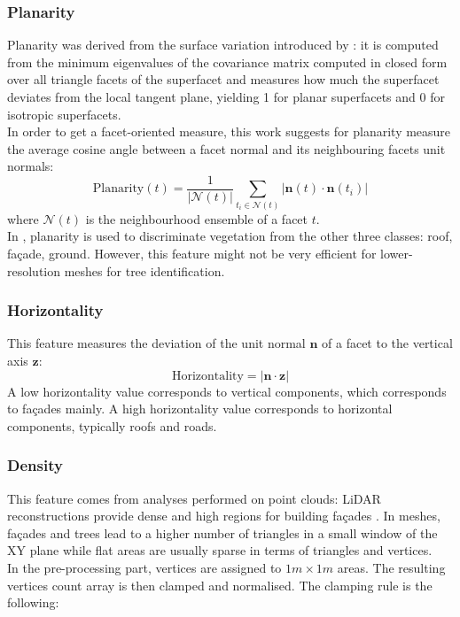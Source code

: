 \documentclass{kththesis}
\begin{document}
\subsubsection{Planarity}
Planarity was derived from the surface variation introduced by \textcite{Pauly2002}: it is computed from the minimum eigenvalues of the covariance
matrix computed in closed form over all triangle facets of the
superfacet and measures how much the superfacet deviates from the local tangent plane, yielding 1 for planar superfacets and 0 for isotropic superfacets.  \\
In order to get a facet-oriented measure, this work suggests for planarity measure the average cosine angle between a facet normal and its neighbouring facets unit normals:
$$\text{Planarity}(t)= \frac{1}{|\mathcal{N}(t)|} \sum \limits_{t_i \in \mathcal{N}(t)}  |\mathbf{n}(t) \cdot \mathbf{n}(t_i)| $$ where $\mathcal{N}(t)$ is the neighbourhood ensemble of a facet $t$. \\
In \textcite{verdie}, planarity is used to discriminate vegetation from the other three classes: roof, façade, ground. However, this feature might not be very efficient for lower-resolution meshes for tree identification. 

\subsubsection{Horizontality}
This feature measures the deviation of the unit normal $\mathbf{n}$ of a facet to the vertical axis $\mathbf{z}$: 
$$\text{Horizontality}=|\mathbf{n} \cdot \mathbf{z}|$$
A low horizontality value corresponds to vertical components, which corresponds to façades mainly. A high horizontality value corresponds to horizontal components, typically roofs and roads. 

\subsubsection{Density}
This feature comes from analyses performed on point clouds: LiDAR reconstructions provide dense and high regions for building façades \parencite{Finnish3Dpc}. In meshes, façades and trees lead to a higher number of triangles in a small window of the XY plane while flat areas are usually sparse in terms of triangles and vertices. \\ 
In the pre-processing part, vertices are assigned to $1m\times1m$ areas. The resulting vertices count array is then clamped and normalised. The clamping rule is the following: \\
\end{document}
